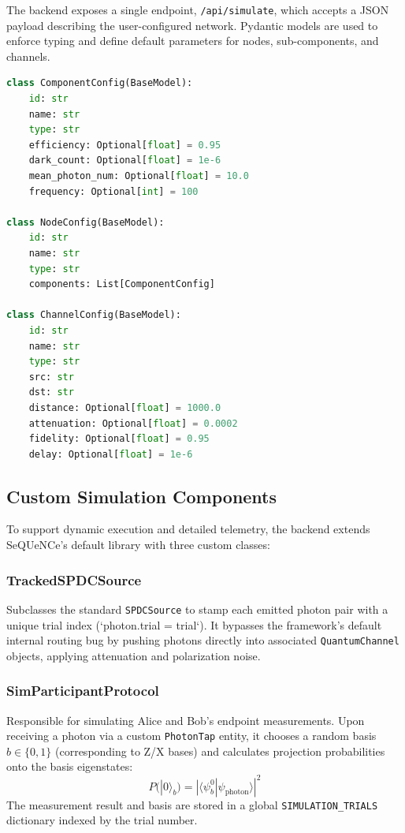 \documentclass[12pt,oneside,letterpaper,english]{article}
\begin{document}
The backend exposes a single endpoint, \texttt{/api/simulate}, which accepts a JSON payload describing the user-configured network. Pydantic models are used to enforce typing and define default parameters for nodes, sub-components, and channels.

\begin{lstlisting}[language=Python, caption={Pydantic configuration models for topology ingestion}, label={lst:pydantic}]
class ComponentConfig(BaseModel):
    id: str
    name: str
    type: str
    efficiency: Optional[float] = 0.95
    dark_count: Optional[float] = 1e-6
    mean_photon_num: Optional[float] = 10.0
    frequency: Optional[int] = 100

class NodeConfig(BaseModel):
    id: str
    name: str
    type: str
    components: List[ComponentConfig]

class ChannelConfig(BaseModel):
    id: str
    name: str
    type: str
    src: str
    dst: str
    distance: Optional[float] = 1000.0
    attenuation: Optional[float] = 0.0002
    fidelity: Optional[float] = 0.95
    delay: Optional[float] = 1e-6
\end{lstlisting}

\subsection{Custom Simulation Components}

To support dynamic execution and detailed telemetry, the backend extends SeQUeNCe's default library with three custom classes:

\subsubsection{TrackedSPDCSource}
Subclasses the standard \texttt{SPDCSource} to stamp each emitted photon pair with a unique trial index (`photon.trial = trial`). It bypasses the framework's default internal routing bug by pushing photons directly into associated \texttt{QuantumChannel} objects, applying attenuation and polarization noise.

\subsubsection{SimParticipantProtocol}
Responsible for simulating Alice and Bob's endpoint measurements. Upon receiving a photon via a custom \texttt{PhotonTap} entity, it chooses a random basis $b \in \{0, 1\}$ (corresponding to Z/X bases) and calculates projection probabilities onto the basis eigenstates:
\begin{equation}
    P(|0\rangle_b) = |\langle \psi_b^0 | \psi_{\text{photon}} \rangle|^2
\end{equation}
The measurement result and basis are stored in a global \texttt{SIMULATION\_TRIALS} dictionary indexed by the trial number.
\end{document}

